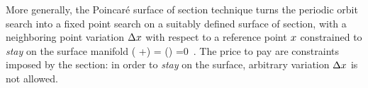 More generally, the Poincar\'e surface of section technique
turns the periodic orbit search into a
fixed point search on a suitably defined surface of section,
with a neighboring point variation $\Delta x$ with respect to
a reference point  $x$ constrained to \emph{stay} on the
surface manifold
\beq
\PoincC( \ssp+\Delta\ssp) = \PoincC (\ssp) =0
\,.
The price to pay are constraints imposed by the section: in
order to \emph{stay} on the surface, arbitrary variation
$\Delta x$ is not allowed.
